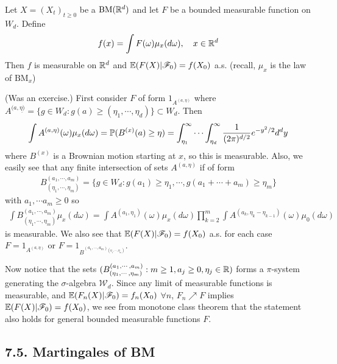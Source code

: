 \documentclass[12pt,a4paper]{report}
\newenvironment{proof}
{\begin{changemargin}{1cm}{0.5cm} 
	}%
	{\end{changemargin}
}
\begin{document}
 Let $X = (X_t)_{t\geq 0}$ be a $\text{BM}(\mathbb{R}^d)$ and let $F$ be a bounded measurable function on $W_d$. Define
\begin{align*}
f(x) = \int F(\omega) \mu_x (d\omega), \quad x\in \mathbb{R}^d
\end{align*}
Then $f$ is measurable on $\mathbb{R}^d$ and $\mathbb{E}(F(X) |\mathscr{F}_0)  = f(X_0)$ a.s. (recall, $\mu_x$ is the law of $\text{BM}_x$)
\begin{proof}
\pf (Was an exercise.) First consider $F$ of form $1_{A^{(a,\eta)}}$ where $A^{(a,\underline{\eta)} } = \{ g \in W_d : g(a) \geq (\eta_1, \cdots, \eta_d ) \} \subset W_d$. Then
\begin{align*}
\int A^{(a,\eta)}(\omega) \mu_x( d\omega) = \mathbb{P} ( B^{(x)} (a) \geq \eta) = \int_{\eta_1}^{\infty} \cdots \int_{\eta_d}^{\infty} \frac{1}{(2\pi)^{d/2}}e^{-y^2 /2} d^d y
\end{align*}
where $B^{(x)}$ is a Brownian motion starting at $x$, so this is measurable. Also, we easily see that any finite intersection of sets $A^{(a,\eta)}$ if of form
\begin{align*}
B^{(a_1, \cdots, a_m)}_{(\eta_1, \cdots, \eta_m)} = \{ g \in W_d : g(a_1) \geq \eta_1, \cdots, g(a_1 + \cdots + a_m) \geq \eta_m \}
\end{align*}
with $a_1, \cdots a_m \geq 0$ so
\begin{align*}
\int B^{(a_1, \cdots, a_m)}_{(\eta_1, \cdots, \eta_m)} \mu_x( d\omega) =  \int A^{(a_1,\eta_1)}(\omega) \mu_x( d\omega) \prod_{k=2}^m \int A^{(a_k,\eta_{k} - \eta_{k-1})}(\omega) \mu_0( d\omega)
\end{align*}
is measurable. We also see that $\mathbb{E}(F(X) | \mathscr{F}_0 ) = f(X_0)$ a.s. for each case $F = 1_{A^{(a,\eta)}}$ or $F = 1_{B^{(a_1, \cdots, a_m)_{(\eta_1, \cdots, \eta_m)}}}$.

\quad Now notice that the sets $(B^{(a_1, \cdots, a_m)}_{(\eta_1, \cdots, \eta_m)} : m\geq 1, a_j \geq 0, \eta_j \in \mathbb{R})$ forms a $\pi$-system generating the $\sigma$-algebra $\mathscr{W}_d$. Since any limit of measurable functions is measurable, and $\mathbb{E}(F_n(X) | \mathscr{F}_0 ) = f_n(X_0)$ $\forall n$, $F_n \nearrow F$ implies $\mathbb{E}(F(X) | \mathscr{F}_0 ) = f(X_0)$, we see from monotone class theorem that the statement also holds for general bounded measurable functions $F$.

\eop
\end{proof}
\s

\subsection*{7.5. Martingales of BM}
\end{document}
